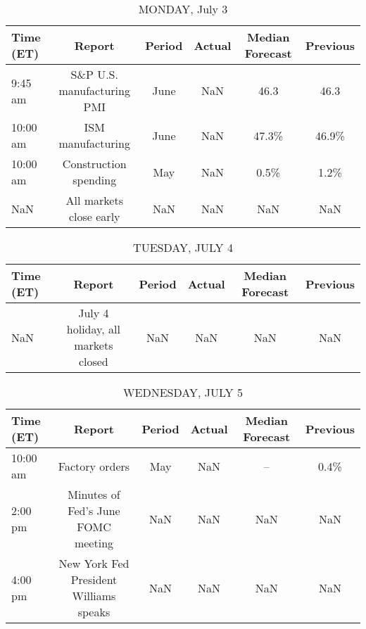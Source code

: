 \documentclass{article}%
\begin{document}
%
\normalsize%


\begin{table}[htbp]%
\caption{MONDAY, July 3}%
\centering%
\begin{adjustbox}{width=1\textwidth}%
\begin{tabular}{lccccc}
\toprule
Time (ET) &                     Report & Period & Actual & Median Forecast & Previous \\
\midrule
  9:45 am & S\&P U.S. manufacturing PMI &   June &    NaN &            46.3 &     46.3 \\
 10:00 am &          ISM manufacturing &   June &    NaN &           47.3\% &    46.9\% \\
 10:00 am &      Construction spending &    May &    NaN &            0.5\% &     1.2\% \\
      NaN &    All markets close early &    NaN &    NaN &             NaN &      NaN \\
\bottomrule
\end{tabular}
%
\end{adjustbox}%
\end{table}

%


\begin{table}[htbp]%
\caption{TUESDAY, JULY 4}%
\centering%
\begin{adjustbox}{width=1\textwidth}%
\begin{tabular}{lccccc}
\toprule
Time (ET) &                             Report & Period & Actual & Median Forecast & Previous \\
\midrule
      NaN & July 4 holiday, all markets closed &    NaN &    NaN &             NaN &      NaN \\
\bottomrule
\end{tabular}
%
\end{adjustbox}%
\end{table}

%


\begin{table}[htbp]%
\caption{WEDNESDAY, JULY 5}%
\centering%
\begin{adjustbox}{width=1\textwidth}%
\begin{tabular}{lccccc}
\toprule
Time (ET) &                                 Report & Period & Actual & Median Forecast & Previous \\
\midrule
 10:00 am &                         Factory orders &    May &    NaN &              -- &     0.4\% \\
  2:00 pm &     Minutes of Fed's June FOMC meeting &    NaN &    NaN &             NaN &      NaN \\
  4:00 pm & New York Fed President Williams speaks &    NaN &    NaN &             NaN &      NaN \\
\bottomrule
\end{tabular}
%
\end{adjustbox}%
\end{table}
\end{document}
